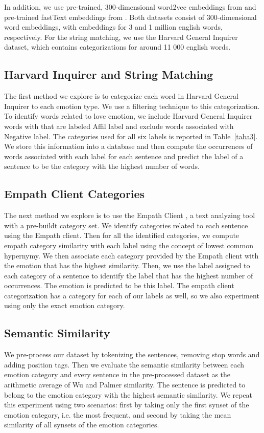 \documentclass[conference]{IEEEtran}
\begin{document}
In addition, we use pre-trained, 300-dimensional word2vec embeddings  from \cite{mikolov2013distributed} and pre-trained fastText embeddings from \cite{bojanowski2016enriching}. Both datasets consist of 300-dimensional word embeddings, with embeddings for 3 and 1 million english words, respectively. For the string matching, we use the Harvard General Inquirer dataset, which contains categorizations for around 11 000 english words.

\subsection{Harvard Inquirer and String Matching}
The first method we explore is to categorize each word in Harvard General Inquirer \cite{harvardgeneralinquirer} to each emotion type. We use a filtering technique to this categorization. To identify words related to love emotion, we include Harvard General Inquirer words with that are labeled Affil label and exclude words associated with Negative label. The categories used for all six labels is reported in Table~\ref{taba3}. We store this information into a database and then compute the occurrences of words associated with each label for each sentence and predict the label of a sentence to be the category with the highest number of words.

\subsection{Empath Client Categories}
The next method we explore is to use the Empath Client \cite{empathclient}, a text analyzing tool with a pre-buildt category set. We identify categories related to each sentence using the Empath client. Then for all the identified categories, we compute empath category similarity with each label using the concept of lowest common hypernymy. We then associate each category provided by the Empath client with the emotion that has the highest similarity. Then, we use the label assigned to each category of a sentence to identify the label that has the highest number of occurrences. The emotion is predicted to be this label. The empath client categorization has a category for each of our labels as well, so we also experiment using only the exact emotion category.

\subsection{Semantic Similarity}
We pre-process our dataset by tokenizing the sentences, removing stop words and adding position tags. Then we evaluate the semantic similarity between each emotion category and every sentence in the pre-processed dataset as the arithmetic average of Wu and Palmer similarity. The sentence is predicted to belong to the emotion category with the highest semantic similarity. We repeat this experiment using two scenarios: first by taking only the first synset of the emotion category, i.e. the most frequent, and second by taking the mean similarity of all synsets of the emotion categories. 
\end{document}
